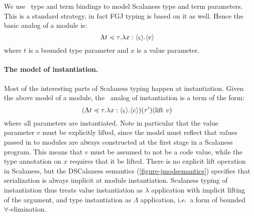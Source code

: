 We use \fml\ type and term bindings to model Scalaness type and term parameters. This is a
standard strategy, in fact FGJ typing \cite{FJ} is based on it as well. Hence the basic analog
of a module is:
$$
\Lambda t \preccurlyeq \tau . \lambda x : \langle \varsigma \rangle . \langle e \rangle
$$
where $t$ is a bounded type parameter and $x$ is a value parameter.

\paragraph{The model of instantiation.} Most of the interesting parts of Scalaness typing happen
at instantiation. Given the above model of a module, the \fml\ analog of instantiation is a term
of the form:
$$
(\Lambda t \preccurlyeq \tau . \lambda x : \langle \varsigma \rangle . \langle e \rangle)(\tau')(\text{lift}\ v)
$$
where all parameters are instantiated. Note in particular that the value parameter $v$ must be
explicitly lifted, since the model must reflect that values passed in to modules are always
constructed at the first stage in a Scalaness program. This means that $v$ must be assumed to
not be a code value, while the type annotation on $x$ requires that it be lifted. There is no
explicit lift operation in Scalaness, but the DSCalaness semantics
(\autoref{figure-jmodsemantics}) specifies that serialization is always implicit at module
instantiation. Scalaness typing of instantiation thus treats value instantiation as $\lambda$
application with implicit lifting of the argument, and type instantiation as $\Lambda$
application, i.e.~a form of bounded $\forall$-elimination.

